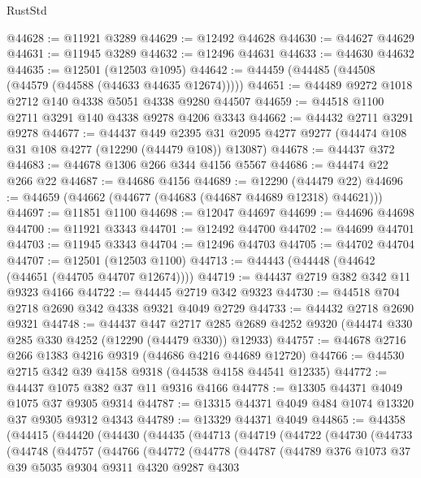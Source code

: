 \begin{lexlean}{RustStd}
\begin{coremodule}
{\begin{coremodule}
{{{{{{{{{{{{{{{{{{{{{{{{{{{{{{{{{{{{{{{{{{{{{{{{{{@44628 := @11921 @3289
@44629 := @12492 @44628
@44630 := @44627 @44629
@44631 := @11945 @3289
@44632 := @12496 @44631
@44633 := @44630 @44632
@44635 := @12501 (@12503 @1095)
@44642 := @44459 (@44485 (@44508 (@44579 (@44588 (@44633 @44635 @12674)))))
@44651 := @44489 @9272 @1018 @2712 @140 @4338 @5051 @4338 @9280 @44507
@44659 := @44518 @1100 @2711 @3291 @140 @4338 @9278 @4206 @3343
@44662 := @44432 @2711 @3291 @9278
@44677 := @44437
    @449
    @2395
    @31
    @2095
    @4277
    @9277
    (@44474 @108 @31 @108 @4277 (@12290 (@44479 @108)) @13087)
@44678 := @44437 @372
@44683 := @44678 @1306 @266 @344 @4156 @5567
@44686 := @44474 @22 @266 @22
@44687 := @44686 @4156
@44689 := @12290 (@44479 @22)
@44696 := @44659 (@44662 (@44677 (@44683 (@44687 @44689 @12318) @44621)))
@44697 := @11851 @1100
@44698 := @12047 @44697
@44699 := @44696 @44698
@44700 := @11921 @3343
@44701 := @12492 @44700
@44702 := @44699 @44701
@44703 := @11945 @3343
@44704 := @12496 @44703
@44705 := @44702 @44704
@44707 := @12501 (@12503 @1100)
@44713 := @44443 (@44448 (@44642 (@44651 (@44705 @44707 @12674))))
@44719 := @44437 @2719 @382 @342 @11 @9323 @4166
@44722 := @44445 @2719 @342 @9323
@44730 := @44518 @704 @2718 @2690 @342 @4338 @9321 @4049 @2729
@44733 := @44432 @2718 @2690 @9321
@44748 := @44437
    @447
    @2717
    @285
    @2689
    @4252
    @9320
    (@44474 @330 @285 @330 @4252 (@12290 (@44479 @330)) @12933)
@44757 := @44678 @2716 @266 @1383 @4216 @9319 (@44686 @4216 @44689 @12720)
@44766 := @44530 @2715 @342 @39 @4158 @9318 (@44538 @4158 @44541 @12335)
@44772 := @44437 @1075 @382 @37 @11 @9316 @4166
@44778 := @13305 @44371 @4049 @1075 @37 @9305 @9314
@44787 := @13315 @44371 @4049 @484 @1074 @13320 @37 @9305 @9312 @4343
@44789 := @13329 @44371 @4049
@44865 := @44358
    (@44415
      (@44420
        (@44430
          (@44435
            (@44713
              (@44719
                (@44722
                  (@44730
                    (@44733
                      (@44748
                        (@44757
                          (@44766
                            (@44772
                              (@44778
                                (@44787
                                  (@44789
                                    @376
                                    @1073
                                    @37
                                    @39
                                    @5035
                                    @9304
                                    @9311
                                    @4320
                                    @9287
                                    @4303
}}}}}}}}}}}}}}}}}}}}}}}}}}}}}}}}}}}}}}}}}}}}}}}}}}
\end{coremodule}}
\end{coremodule}
\end{lexlean}
